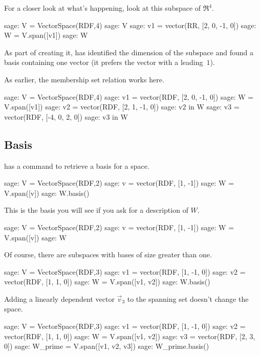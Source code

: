 For a closer look at what's happening, look at this subspace of $\Re^4$.
\begin{sagecommandline}
sage: V = VectorSpace(RDF,4)
sage: V
sage: v1 = vector(RR, [2, 0, -1, 0])
sage: W = V.span([v1])
sage: W
\end{sagecommandline}
As part of creating it,
\Sage{} has identified the dimension of the subspace and found
a basis containing one vector (it prefers the vector with a leading~$1$).

As earlier, the membership set relation works here.
\begin{sagecommandline}
sage: V = VectorSpace(RDF,4)
sage: v1 = vector(RDF, [2, 0, -1, 0])
sage: W = V.span([v1])
sage: v2 = vector(RDF, [2, 1, -1, 0])
sage: v2 in W
sage: v3 = vector(RDF, [-4, 0, 2, 0])
sage: v3 in W
\end{sagecommandline}



\subsection{Basis}
\Sage{} has a command to retrieve a basis for a space.
\begin{sagecommandline}
sage: V = VectorSpace(RDF,2)
sage: v = vector(RDF, [1, -1])
sage: W = V.span([v])     
sage: W.basis()
\end{sagecommandline}
\noindent
This is the basis you will see if you ask for a description of $W$.
\begin{sagecommandline}
sage: V = VectorSpace(RDF,2)
sage: v = vector(RDF, [1, -1])
sage: W = V.span([v])     
sage: W  
\end{sagecommandline}

Of course, there are subspaces with bases of size greater than one.
\begin{sagecommandline}
sage: V = VectorSpace(RDF,3)               
sage: v1 = vector(RDF, [1, -1, 0]) 
sage: v2 = vector(RDF, [1, 1, 0]) 
sage: W = V.span([v1, v2])       
sage: W.basis()
\end{sagecommandline}
Adding a linearly dependent vector $\vec{v}_3$ to the spanning
set doesn't change the space.
\begin{sagecommandline}
sage: V = VectorSpace(RDF,3)               
sage: v1 = vector(RDF, [1, -1, 0]) 
sage: v2 = vector(RDF, [1, 1, 0]) 
sage: W = V.span([v1, v2])       
sage: v3 = vector(RDF, [2, 3, 0])
sage: W_prime = V.span([v1, v2, v3])
sage: W_prime.basis()
\end{sagecommandline}

